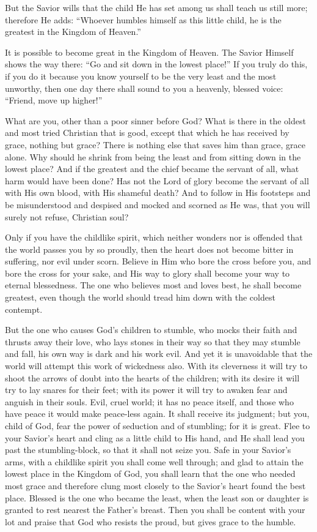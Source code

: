 But the Savior wills that the child He has set among us shall teach us still more; therefore He adds: “Whoever humbles himself as this little child, he is the greatest in the Kingdom of Heaven.”

It is possible to become great in the Kingdom of Heaven. The Savior Himself shows the way there: “Go and sit down in the lowest place!” If you truly do this, if you do it because you know yourself to be the very least and the most unworthy, then one day there shall sound to you a heavenly, blessed voice: “Friend, move up higher!”

What are you, other than a poor sinner before God? What is there in the oldest and most tried Christian that is good, except that which he has received by grace, nothing but grace? There is nothing else that saves him than grace, grace alone. Why should he shrink from being the least and from sitting down in the lowest place? And if the greatest and the chief became the servant of all, what harm would have been done? Has not the Lord of glory become the servant of all with His own blood, with His shameful death? And to follow in His footsteps and be misunderstood and despised and mocked and scorned as He was, that you will surely not refuse, Christian soul?

Only if you have the childlike spirit, which neither wonders nor is offended that the world passes you by so proudly, then the heart does not become bitter in suffering, nor evil under scorn. Believe in Him who bore the cross before you, and bore the cross for your sake, and His way to glory shall become your way to eternal blessedness. The one who believes most and loves best, he shall become greatest, even though the world should tread him down with the coldest contempt.

But the one who causes God’s children to stumble, who mocks their faith and thrusts away their love, who lays stones in their way so that they may stumble and fall, his own way is dark and his work evil. And yet it is unavoidable that the world will attempt this work of wickedness also. With its cleverness it will try to shoot the arrows of doubt into the hearts of the children; with its desire it will try to lay snares for their feet; with its power it will try to awaken fear and anguish in their souls. Evil, cruel world; it has no peace itself, and those who have peace it would make peace-less again. It shall receive its judgment; but you, child of God, fear the power of seduction and of stumbling; for it is great. Flee to your Savior’s heart and cling as a little child to His hand, and He shall lead you past the stumbling-block, so that it shall not seize you. Safe in your Savior’s arms, with a childlike spirit you shall come well through; and glad to attain the lowest place in the Kingdom of God, you shall learn that the one who needed most grace and therefore clung most closely to the Savior’s heart found the best place. Blessed is the one who became the least, when the least son or daughter is granted to rest nearest the Father’s breast. Then you shall be content with your lot and praise that God who resists the proud, but gives grace to the humble.

